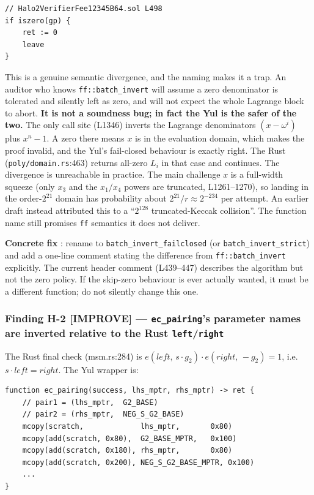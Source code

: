 \begin{lstlisting}[style=yul]
// Halo2VerifierFee12345B64.sol L498
if iszero(gp) {
    ret := 0
    leave
}
\end{lstlisting}

This is a genuine semantic divergence, and the naming makes it a trap.
An auditor who knows \texttt{ff::batch\_invert} will assume a zero
denominator is tolerated and silently left as zero, and will not expect
the whole Lagrange block to abort. \textbf{It is not a soundness bug;
in fact the Yul is the safer of the two.} The only call site
(L1346) inverts the Lagrange denominators $(x-\omega^i)$ plus $x^n-1$.
A zero there means $x$ is in the evaluation domain, which makes the
proof invalid, and the Yul's fail-closed behaviour is exactly right.
The Rust (\texttt{poly/domain.rs}:463) returns all-zero $L_i$ in
that case and continues. The divergence is unreachable in practice.
The main challenge $x$ is a full-width squeeze (only $x_3$ and the
$x_1/x_4$ powers are truncated, L1261--1270), so landing in the
order-$2^{21}$ domain has probability about $2^{21}/r\approx2^{-234}$
per attempt. An earlier draft instead attributed this to a
``$2^{128}$ truncated-Keccak collision''. The function name still
promises \texttt{ff} semantics it does not deliver.

\textbf{Concrete fix} : rename to
\texttt{batch\_\allowbreak{}invert\_\allowbreak{}failclosed} (or \texttt{batch\_\allowbreak{}invert\_\allowbreak{}strict})
and add a one-line comment stating the difference from
\texttt{ff::batch\_invert} explicitly. The current header comment
(L439--447) describes the algorithm but not the zero policy. If the
skip-zero behaviour is ever actually wanted, it must be a different
function; do not silently change this one.

\subsubsection*{Finding H-2 \textcolor{codegenblue}{[IMPROVE]} --- \texttt{ec\_pairing}'s parameter names are inverted relative to the Rust \texttt{left}/\texttt{right}}

The Rust final check (msm.rs:284) is
$e(\mathit{left},\, s\cdot g_2)\cdot e(\mathit{right},\, -g_2)=1$,
i.e.\ $s\cdot\mathit{left}=\mathit{right}$. The Yul wrapper is:

\begin{lstlisting}[style=yul]
function ec_pairing(success, lhs_mptr, rhs_mptr) -> ret {
    // pair1 = (lhs_mptr,  G2_BASE)
    // pair2 = (rhs_mptr,  NEG_S_G2_BASE)
    mcopy(scratch,             lhs_mptr,       0x80)
    mcopy(add(scratch, 0x80),  G2_BASE_MPTR,   0x100)
    mcopy(add(scratch, 0x180), rhs_mptr,       0x80)
    mcopy(add(scratch, 0x200), NEG_S_G2_BASE_MPTR, 0x100)
    ...
}
\end{lstlisting}


